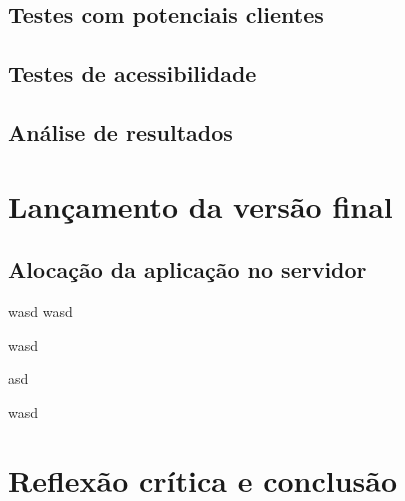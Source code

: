 \documentclass[11pt, twoside]{report}
\begin{document}
	\section{Testes com potenciais clientes}
	\section{Testes de acessibilidade}
	\section{Análise de resultados}
	
	\chapter{Lançamento da versão final}
	\section{Alocação da aplicação no servidor}
	
	\pagebreak
	wasd
	wasd
	
	
	wasd
	
	
	\pagebreak
	
	asd
	
	wasd
	\chapter{Reflexão crítica e conclusão}
	
	

	
	
	
\end{document}
